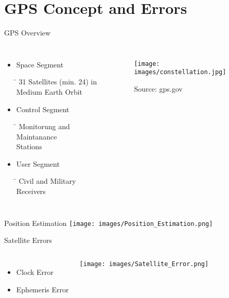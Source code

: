 \documentclass[12pt, compress, xcolor=table]{beamer}
\begin{document}
\section{GPS Concept and Errors}

\begin{frame}{GPS Overview}
  \begin{columns}

    \begin{itemize}
    
      \item Space Segment
      \begin{tabbing}
      \hspace*{0.5cm}\= \kill
      \> \footnotesize{31 Satellites (min. 24) in} \\
      \> \footnotesize{Medium Earth Orbit} \\
      \end{tabbing}

      \item Control Segment
      \begin{tabbing}
      \hspace*{0.5cm}\= \kill
      \> \footnotesize{Monitorung and Maintanance} \\
      \> \footnotesize{Stations} \\
      \end{tabbing}
      
      \item User Segment
      \begin{tabbing}
      \hspace*{0.5cm}\= \kill
      \> \footnotesize{Civil and Military Receivers}
      \end{tabbing}
      
    \end{itemize}
 
    \begin{figure}
     \texttt{[image: images/constellation.jpg]}
    \caption*{Source: gps.gov}
    \end{figure}
  \end{columns}
\end{frame}

\begin{frame}{Position Estimation}
 \texttt{[image: images/Position\_Estimation.png]}
\end{frame}

\begin{frame}{Satellite Errors}
 \begin{columns}
  \begin{itemize}
  \setlength\itemsep{0.5cm}
   \item Clock Error
   \item Ephemeris Error
  \end{itemize}

  \texttt{[image: images/Satellite\_Error.png]}
  
 \end{columns}
\end{frame}
\end{document}
